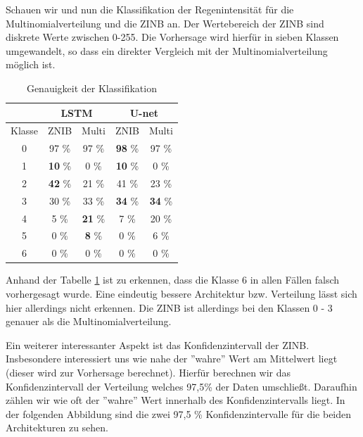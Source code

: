 \noindent Schauen wir und nun die Klassifikation der Regenintensität für die Multinomialverteilung und die ZINB an.
Der Wertebereich der ZINB sind diskrete Werte zwischen 0-255. Die Vorhersage wird hierfür in sieben Klassen umgewandelt, so dass ein direkter Vergleich mit der Multinomialverteilung möglich ist.\\


\begin{table}[h]
\centering
\begin{tabular}[h]{|c|cc|cc|}
\hline
&\multicolumn{2}{c}{LSTM} &
\multicolumn{2}{c|}{U-net} \\
\hline
Klasse & ZNIB & Multi & ZNIB & Multi \\
\hline
0 & 97 \% & 97 \% & \textbf{98} \% & 97 \% \\
\hline
1 & \textbf{10} \% & 0 \% & \textbf{10} \% & 0 \% \\
\hline
2 & \textbf{42} \% & 21 \% & 41 \% & 23 \% \\
\hline
3 & 30 \% & 33 \% & \textbf{34} \% & \textbf{34} \% \\
\hline
4 & 5 \% & \textbf{21} \% & 7 \% & 20 \% \\
\hline
5 & 0 \% & \textbf{8} \% & 0 \% & 6 \% \\
\hline
6 & 0 \% & 0 \% & 0 \% & 0 \% \\
\hline
\end{tabular}
\caption{Genauigkeit der Klassifikation\label{tab:raintable}}
\end{table}

\noindent Anhand der Tabelle \ref{tab:raintable} ist zu erkennen, dass die Klasse 6 in allen Fällen falsch vorhergesagt wurde.
Eine eindeutig bessere Architektur bzw. Verteilung lässt sich hier allerdings nicht erkennen. Die ZINB ist allerdings bei den Klassen 0 - 3 genauer als die Multinomialverteilung.


\noindent Ein weiterer interessanter Aspekt ist das Konfidenzintervall der ZINB. Insbesondere interessiert uns wie nahe der ''wahre'' Wert am Mittelwert liegt (dieser wird zur Vorhersage berechnet).
Hierfür berechnen wir das Konfidenzintervall der Verteilung welches 97,5\% der Daten umschließt. Daraufhin zählen wir wie oft der ''wahre'' Wert innerhalb des Konfidenzintervalls liegt.
In der folgenden Abbildung sind die zwei 97,5 \% Konfidenzintervalle für die beiden Architekturen zu sehen.\\

